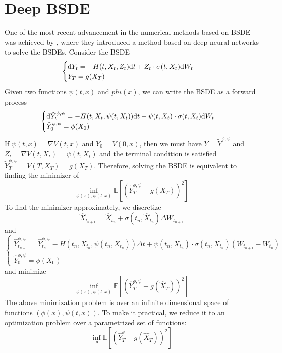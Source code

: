 \documentclass[11pt]{book}
\newcommand{\dd}{\text{\normalfont d}}
\newcommand{\dt}{\text{\normalfont d}t}
\newcommand{\dW}{\text{\normalfont d}W}
\begin{document}
\section{Deep BSDE}
One of the most recent advancement in the numerical methods based on BSDE was achieved by \citet{HJE18}, where they introduced a method based on deep neural networks to solve the BSDEs.
Consider the BSDE
\begin{equation}
    \begin{cases}
        \dd Y_t = -H(t,{X}_t,Z_t)\dt + Z_t\cdot\sigma(t,X_t)\dW_t\\
        Y_T=g({X}_T)
    \end{cases}
\end{equation}
Given two functions $\psi(t,x)$ and $phi(x)$, we can write the BSDE as a forward process
\begin{equation}
    \begin{cases}
        \dd \tilde{Y}^{\phi,\psi}_t = -H(t,{X}_t,\psi(t,X_t))\dt + \psi(t,X_t)\cdot\sigma(t,X_t)\dW_t\\
        \tilde{Y}^{\phi,\psi}_0= \phi(X_0)
    \end{cases}
\end{equation}
If $\psi(t,x)= \nabla V(t,x)$ and $Y_0=V(0,x)$, then we must have $Y=\tilde{Y}^{\phi,\psi}$ and $Z_t=\nabla V(t,X_t)=\psi(t,X_t)$ and the terminal condition is satisfied $\tilde{Y}^{\phi,\psi}_T=V(T,X_T)=g(X_T)$. Therefore, solving the BSDE is equivalent to finding the minimizer of
\[
\inf_{\phi(x),\psi(t,x)}\mathbb{E}\left[\left(\tilde{Y}^{\phi,\psi}_T-g(X_T)\right)^2\right]
\]
To find the minimizer approximately, we discretize 
\[
\hat{X}_{t_{n+1}}=\hat{X}_{t_{n}} + \sigma(t_n,\hat{X}_{t_{n}})\Delta W_{t_{n+1}}
\]
and 
\begin{equation}
    \begin{cases}
        \hat{Y}^{\phi,\psi}_{t_{n+1}} = \hat{Y}^{\phi,\psi}_{t_{n}} -H(t_n,{X}_{t_{n}},\psi(t_n,{X}_{t_{n}}))\Delta t + \psi(t_n,{X}_{t_{n}})\cdot\sigma(t_n,{X}_{t_{n}})(W_{t_{n+1}}-W_{t_{n}})\\
        \hat{Y}^{\phi,\psi}_0= \phi(X_0)
    \end{cases}
\end{equation}
and minimize
\[
\inf_{\phi(x),\psi(t,x)}\mathbb{E}\left[\left(\hat{Y}^{\phi,\psi}_T-g(\hat{X}_T)\right)^2\right]
\]
The above minimization problem is over an infinite dimensional space of functions $(\phi(x),\psi(t,x))$. To make it practical, we reduce it to an optimization problem over a parametrized set of functions:
\[
\inf_{\theta}\mathbb{E}\left[\left(\hat{Y}^{\theta}_T-g(\hat{X}_T)\right)^2\right]
\]
\end{document}
